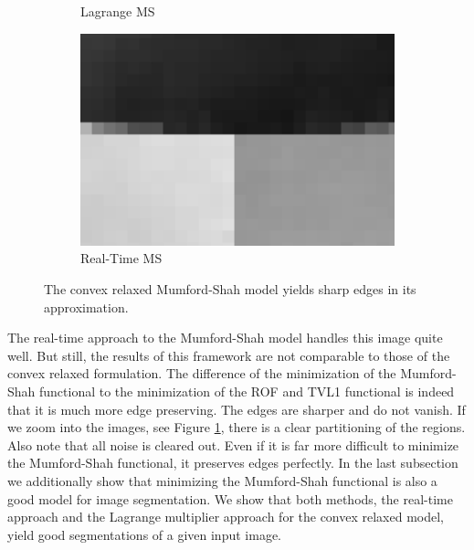\documentclass[abstracton]{scrreprt}
\begin{document}
\begin{figure}[!ht]
\begin{subfigure}[b]{0.31\textwidth}
                    \caption{Lagrange MS}
                \end{subfigure}
                \begin{subfigure}[b]{0.31\textwidth}
                    \includegraphics[width=\textwidth]{img/zoomed/gauss_noise_rt_zoomed.png}
                    \caption{Real-Time MS}
                \end{subfigure}
                \caption[Gauss denoising comparison of several models with zooming into images.]{The convex relaxed Mumford-Shah model yields sharp edges in its approximation.}
            \label{fig:synth_gauss_compare_zoomed}
            \end{figure}

            The real-time approach to the Mumford-Shah model handles this image quite well. But still, the results of this framework are not comparable to those of the convex relaxed formulation. The difference of the minimization of the Mumford-Shah functional to the minimization of the ROF and TVL1 functional is indeed that it is much more edge preserving. The edges are sharper and do not vanish. If we zoom into the images, see Figure \ref{fig:synth_gauss_compare_zoomed}, there is a clear partitioning of the regions. Also note that all noise is cleared out. Even if it is far more difficult to minimize the Mumford-Shah functional, it preserves edges perfectly. In the last subsection we additionally show that minimizing the Mumford-Shah functional is also a good model for image segmentation. We show that both methods, the real-time approach and the Lagrange multiplier approach for the convex relaxed model, yield good segmentations of a given input image.
\end{document}
